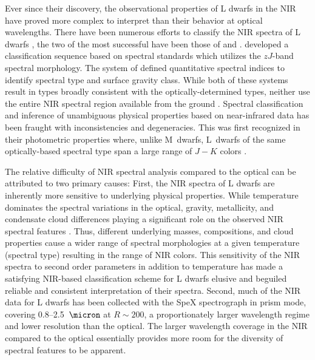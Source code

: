 \documentclass[12pt]{aastex6}
\begin{document}
Ever since their discovery, the observational properties of L dwarfs in the NIR have proved more complex to interpret than their behavior at optical wavelengths.
There have been numerous efforts to classify the NIR spectra of L dwarfs \citep{Reid01_NIR, Testi01, Geballe02,Burgasser07_subdwarfs}, the two of the most successful have been those of \citet{Kirkpatrick10} and \citet{Allers:2013hk}.
\citet{Kirkpatrick10} developed a classification sequence based on spectral standards which utilizes the $zJ$-band spectral morphology.
The system of \citet{Allers:2013hk} defined quantitative spectral indices to identify spectral type and surface gravity class.
While both of these systems result in types broadly consistent with the optically-determined types, neither use the entire NIR spectral region available from the ground \citep{Kirkpatrick05}.
Spectral classification and inference of unambiguous physical properties based on near-infrared data has been fraught with inconsistencies and degeneracies.
This was first recognized in their photometric properties where, unlike M~dwarfs, L~dwarfs of the same optically-based spectral type span a large range of $J-K$ colors \citep[e.g.,][]{Leggett:2003tm}.

The relative difficulty of NIR spectral analysis compared to the optical can be attributed to two primary causes:
First, the NIR spectra of L dwarfs are inherently more sensitive to underlying physical properties.
While temperature dominates the spectral variations in the optical, gravity, metallicity, and condensate cloud differences playing a significant role on the observed NIR spectral features \citep{Jones:1997hb,Knapp04}.
Thus, different underlying masses, compositions, and cloud properties cause a wider range of spectral morphologies at a given temperature (spectral type) resulting in the range of NIR colors.
This sensitivity of the NIR spectra to second order parameters in addition to temperature has made a satisfying NIR-based classification scheme for L dwarfs elusive and beguiled reliable and consistent interpretation of their spectra.
Second, much of the NIR data for L dwarfs has been collected with the SpeX spectrograph in prism mode, covering 0.8--2.5~$\micron$ at $R\sim200$, a proportionately larger wavelength regime and lower resolution than the optical.
The larger wavelength coverage in the NIR compared to the optical essentially provides more room for the diversity of spectral features to be apparent.
\end{document}
